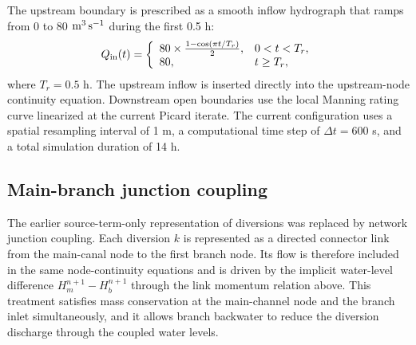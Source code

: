 The upstream boundary is prescribed as a smooth inflow hydrograph that ramps
from 0 to 80 \({\rm m^3\,s^{-1}}\) during the first 0.5 h:
\begin{equation}
    Q_{\rm in}(t) =
    \left\{
    \begin{array}{ll}
        80 \times
        \frac{1-\cos(\pi t/T_r)}{2},
        & 0 < t < T_r, \\
        80, & t \ge T_r,
    \end{array}
    \right.
\end{equation}
where \(T_r=0.5\) h. The upstream inflow is inserted directly into the
upstream-node continuity equation. Downstream open boundaries use the local
Manning rating curve linearized at the current Picard iterate. The current
configuration uses a spatial resampling interval of 1 m, a computational time
step of \(\Delta t=600\) s, and a total simulation duration of 14 h.

\subsection{Main-branch junction coupling}

The earlier source-term-only representation of diversions was replaced by
network junction coupling. Each diversion \(k\) is represented as a directed
connector link from the main-canal node to the first branch node. Its flow is
therefore included in the same node-continuity equations and is driven by the
implicit water-level difference \(H_m^{n+1}-H_b^{n+1}\) through the link
momentum relation above. This treatment satisfies mass conservation at the
main-channel node and the branch inlet simultaneously, and it allows branch
backwater to reduce the diversion discharge through the coupled water levels.

